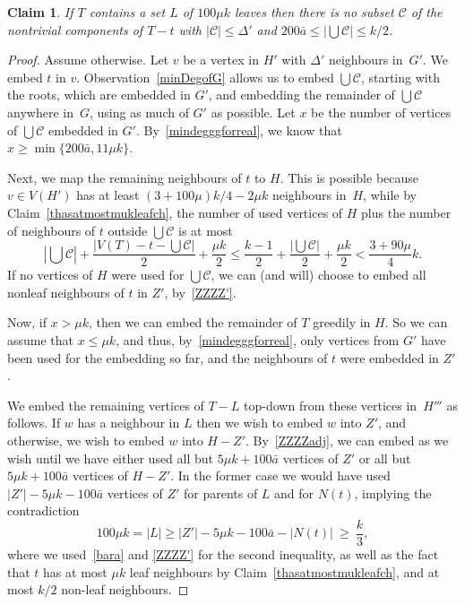 \documentclass[12pt]{article}
\newtheorem{claim}[theorem]{Claim}
\begin{document}
               \begin{claim}\label{notcase2.1'}
     If $T$ contains a set $L$ of  $100\mu k$ leaves 
     then   there is no subset $\mathcal C$ of the nontrivial components of
     $T-t$ with $|\mathcal C|\le \Delta'$ and $200\bar a\le |\bigcup \mathcal C|\le k/2$.
         \end{claim}

  \begin{proof}       
        Assume otherwise. 
        Let $v$ be a vertex in $H'$ with   $\Delta'$ neighbours in~$G'$. We embed $t$ in $v$. 
Observation~\ref{minDegofG} allows us to embed  $\bigcup\mathcal C$, starting with the roots, which are embedded in $G'$, and embedding the remainder of $\bigcup\mathcal C$ anywhere  in~$G$, using as much of $G'$ as possible. 
          Let $x$ be the number of vertices  of $\bigcup\mathcal C$ embedded in $G'$. By~\eqref{mindegggforreal}, we know that $x\ge \min\{200\bar a, 11\mu k\}$.

 
Next, we map the remaining  neighbours of $t$ 
to $H$. 
This is possible 
because~$v\in V(H')$ has  at least $(3+100\mu)k/4-2\mu k$ neighbours in~$H$, while by Claim~\ref{thasatmostmukleafch}, the number of used vertices of $H$ plus the number of neighbours of $t$ outside $\bigcup \mathcal C$ is at most $$|\bigcup \mathcal C|+ \frac{|V(T)-t-\bigcup \mathcal C|}2 + 
         \frac{\mu k}2\le \frac{k-1}2+\frac{|\bigcup \mathcal C|}2+ \frac{\mu k}2<\frac {3+90\mu}4k.$$
         If no vertices of $H$ were used for $\bigcup\mathcal C$, we can (and will) choose to embed all nonleaf neighbours of $t$ in  $Z'$, by~\eqref{ZZZZ'}.
        
 Now, if $x> \mu k$, 
then we can embed the remainder of $T$ greedily in $H$.       
         So we can assume that $x\le\mu k$,  and thus, by~\eqref{mindegggforreal}, only vertices from $G'$ have been used for the embedding so far, and the  neighbours of $t$ were embedded in  $Z'$.
    
    We embed the remaining vertices of $T-L$ top-down from these vertices  in~$H'''$ as follows. If $w$ has a neighbour in $L$ then we  wish to embed $w$ into $Z'$, and otherwise, we  wish to embed $w$ into $H- Z'$. By~\eqref{ZZZZadj}, we can embed as we wish until we have either used all but $5\mu k+100\bar a$ vertices of $Z'$ or all but $5\mu k+100\bar a$ vertices of $H-Z'$. 
     In the former case we would have used $|Z'|-5\mu k-100\bar a$ vertices of $Z'$ for parents of $L$ and for $N(t)$, implying the contradiction $$100\mu k=|L|\ge |Z'|-5\mu k-100\bar a - |N(t)|\ \ge \ \frac k3,$$  where we used~\eqref{bara} and \eqref{ZZZZ'}   for the second inequality, as well as the fact that  $t$ has at most $\mu k$ leaf neighbours by Claim~\ref{thasatmostmukleafch}, and at most $k/2$ non-leaf neighbours.
     

\end{proof}
\end{document}
